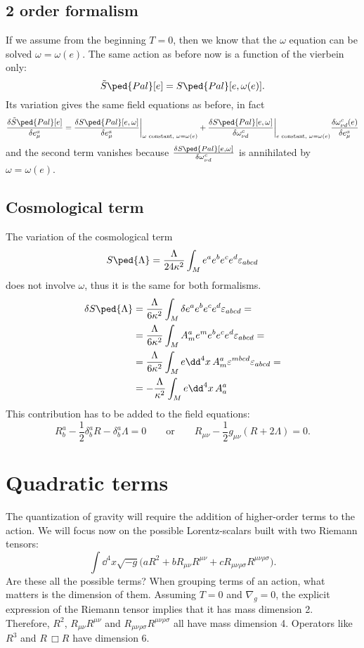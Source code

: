 \documentclass[a4paper,12pt]{book}
\begin{document}
\subsection{2 order formalism}
If we assume from the beginning $T=0$, then we know that the $\omega$ equation can be solved $\omega=\omega(e)$. The same action as before now is a function of the vierbein only:
\[\tilde S\ped{Pal}[e]=S\ped{Pal}[e,\omega(e)].\]
Its variation gives the same field equations as before, in fact
\[\frac{\delta\tilde S\ped{Pal}[e]}{\delta e^a_\mu}=\frac{\delta S\ped{Pal}[e,\omega]}{\delta e^a_\mu}\bigg|_{\omega\text{ constant, }\omega=\omega(e)}+\frac{\delta S\ped{Pal}[e,\omega]}{\delta\omega^c_{\nu d}}\bigg|_{e\text{ constant, }\omega=\omega(e)}\frac{\delta\omega^c_{\nu d}(e)}{\delta e^a_\mu}\]
and the second term vanishes because $\frac{\delta S\ped{Pal}[e,\omega]}{\delta\omega^c_{\nu d}}$ is annihilated by $\omega=\omega(e)$.

\subsection{Cosmological term}
The variation of the cosmological term
\[S\ped{\Lambda}=\frac{\Lambda}{24\kappa^2}\int_Me^ae^be^ce^d\varepsilon_{abcd}\]
does not involve $\omega$, thus it is the same for both formalisms.
\begin{align*}
\delta S\ped{\Lambda}&=\frac{\Lambda}{6\kappa^2}\int_M\delta e^ae^be^ce^d\varepsilon_{abcd}=\\
&=\frac{\Lambda}{6\kappa^2}\int_MA^a_me^me^be^ce^d\varepsilon_{abcd}=\\
&=\frac{\Lambda}{6\kappa^2}\int_Me\dd^4x\,A^a_m\varepsilon^{mbcd}\varepsilon_{abcd}=\\
&=-\frac{\Lambda}{\kappa^2}\int_Me\dd^4x\, A^a_a
\end{align*}
This contribution has to be added to the field equations:
\[R^a_b-\frac{1}{2}\delta^a_bR-\delta^a_b\Lambda=0\qquad\text{or}\qquad R_{\mu\nu}-\frac{1}{2}g_{\mu\nu}(R+2\Lambda)=0.\]

\section{Quadratic terms}
The quantization of gravity will require the addition of higher-order terms to the action. We will focus now on the possible Lorentz-scalars built with two Riemann tensors:
\begin{equation}
\label{eqn:quadratic}
\int\dd^4 x\sqrt{-g}\bigl(aR^2+bR_{\mu\nu}R^{\mu\nu}+cR_{\mu\nu\rho\sigma}R^{\mu\nu\rho\sigma}\bigr).
\end{equation}
Are these all the possible terms? When grouping terms of an action, what matters is the dimension of them. Assuming $T=0$ and $\nabla_g=0$, the explicit expression of the Riemann tensor implies that it has mass dimension 2. Therefore, $R^2$, $R_{\mu\nu}R^{\mu\nu}$ and $R_{\mu\nu\rho\sigma}R^{\mu\nu\rho\sigma}$ all have mass dimension 4. Operators like $R^3$ and $R\,\Box R$ have dimension 6.
\end{document}
